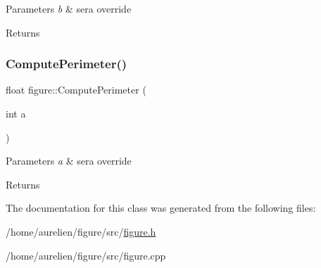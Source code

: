 \begin{DoxyParams}{Parameters}
{\em b} & sera override \\
\hline
\end{DoxyParams}
\begin{DoxyReturn}{Returns}

\end{DoxyReturn}
\mbox{\label{classfigure_ace592f5ccc0020afb1bee680b6806427}} 
\subsubsection{\texorpdfstring{Compute\+Perimeter()}{ComputePerimeter()}}
{\footnotesize\ttfamily float figure\+::\+Compute\+Perimeter (\begin{DoxyParamCaption}\item[{int}]{a }\end{DoxyParamCaption})\hspace{0.3cm}{\ttfamily [virtual]}}


\begin{DoxyParams}{Parameters}
{\em a} & sera override \\
\hline
\end{DoxyParams}
\begin{DoxyReturn}{Returns}

\end{DoxyReturn}


The documentation for this class was generated from the following files\+:\begin{DoxyCompactItemize}
\item 
/home/aurelien/figure/src/\hyperlink{figure_8h}{figure.\+h}\item 
/home/aurelien/figure/src/figure.\+cpp\end{DoxyCompactItemize}
